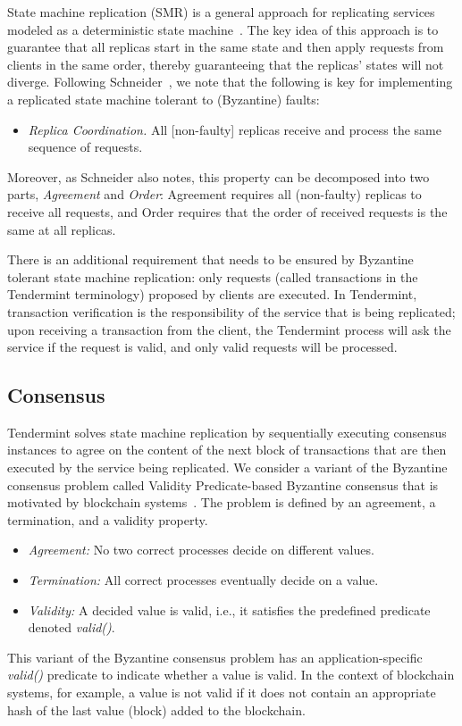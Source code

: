 State machine replication (SMR) is a general approach for replicating services
modeled as a deterministic state machine~\cite{Lam78:cacm,Sch90:survey}.  The
key idea of this approach is to guarantee that all replicas start in the same
state and then apply requests from clients in the same order, thereby
guaranteeing that the replicas' states will not diverge.  Following
Schneider~\cite{Sch90:survey}, we note that the following is key for
implementing a replicated state machine tolerant to (Byzantine) faults:

\begin{itemize} \item \emph{Replica Coordination.} All [non-faulty] replicas
    receive and process the same sequence of requests.  \end{itemize}

Moreover, as Schneider also notes, this property can be decomposed into two
parts, \emph{Agreement} and \emph{Order}: Agreement requires all (non-faulty)
replicas to receive all requests, and Order requires that the order of received
requests is the same at all replicas.

There is an additional requirement that needs to be ensured by Byzantine
tolerant state machine replication: only requests (called transactions in the
Tendermint terminology) proposed by clients are executed. In Tendermint,
transaction verification is the responsibility of the service that is being
replicated; upon receiving a transaction from the client, the Tendermint
process will ask the service if the request is valid, and only valid requests
will be processed. 

 \subsection{Consensus} \label{sec:consensus}

Tendermint solves state machine replication by sequentially executing consensus
instances to agree on the content of the next block of transactions that are
then executed by the service being replicated. We consider a variant of the
Byzantine consensus problem called Validity Predicate-based Byzantine consensus
that is motivated by blockchain systems~\cite{GLR17:red-belly-bc}. The problem
is defined by an agreement, a termination, and a validity property.

 \begin{itemize} \item \emph{Agreement:} No two correct processes decide on
         different values.  \item \emph{Termination:} All correct processes
         eventually decide on a value.  \item \emph{Validity:} A decided value
             is valid, i.e., it satisfies the predefined predicate denoted
             \emph{valid()}.  \end{itemize}

 This variant of the Byzantine consensus problem has an application-specific
 \emph{valid()} predicate to indicate whether a value is valid. In the context
 of blockchain systems, for example, a value is not valid if it does not
 contain an appropriate hash of the last value (block) added to the blockchain.
